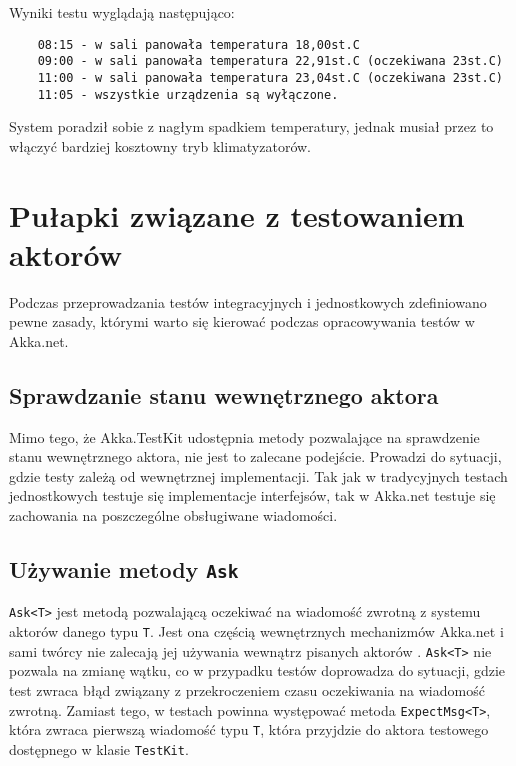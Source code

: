 Wyniki testu wyglądają następująco:
\begin{lstlisting}
    08:15 - w sali panowała temperatura 18,00st.C 
    09:00 - w sali panowała temperatura 22,91st.C (oczekiwana 23st.C)
    11:00 - w sali panowała temperatura 23,04st.C (oczekiwana 23st.C)
    11:05 - wszystkie urządzenia są wyłączone.
\end{lstlisting}
System poradził sobie z nagłym spadkiem temperatury, jednak musiał przez to włączyć bardziej kosztowny tryb klimatyzatorów.

\section{Pułapki związane z testowaniem aktorów}
Podczas przeprowadzania testów integracyjnych i jednostkowych zdefiniowano pewne zasady, którymi warto się kierować podczas opracowywania testów w Akka.net.

\subsection{Sprawdzanie stanu wewnętrznego aktora}
Mimo tego, że Akka.TestKit udostępnia metody pozwalające na sprawdzenie stanu wewnętrznego aktora, nie jest to zalecane podejście. 
Prowadzi do sytuacji, gdzie testy zależą od wewnętrznej implementacji. 
Tak jak w tradycyjnych testach jednostkowych testuje się implementacje interfejsów, tak w Akka.net testuje się zachowania na poszczególne obsługiwane wiadomości.

\subsection{Używanie metody \lstinline{Ask} }
\lstinline{Ask<T>} jest metodą pozwalającą oczekiwać na wiadomość zwrotną z systemu aktorów danego typu \lstinline{T}.
Jest ona częścią wewnętrznych mechanizmów Akka.net i sami twórcy nie zalecają jej używania wewnątrz pisanych aktorów \cite{bib:AkkaNoAsk}. 
\lstinline{Ask<T>} nie pozwala na zmianę wątku, co w przypadku testów doprowadza do sytuacji, gdzie test zwraca błąd związany z przekroczeniem czasu oczekiwania na wiadomość zwrotną. Zamiast tego, w testach powinna występować metoda \lstinline{ExpectMsg<T>}, która zwraca pierwszą wiadomość typu \lstinline{T}, która przyjdzie do aktora testowego dostępnego w klasie \lstinline{TestKit}.  